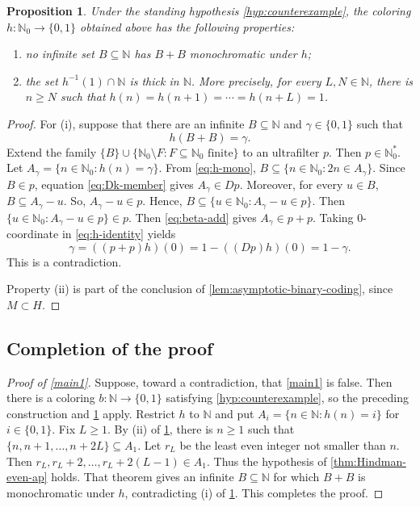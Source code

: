 \documentclass[reqno,12pt]{amsart}
\newtheorem{prop}[thm]{Proposition}
\newcommand{\Nzero}{\mathbb N_0}
\newcommand{\Nstar}{\Nzero^{*}}
\newcommand{\two}{\{0,1\}}
\def \N {\mathbb N}
\numberwithin{equation}{section}
\begin{document}
\begin{prop}\label{prop:counterexample-factor}
Under the standing hypothesis \eqref{hyp:counterexample}, the coloring
$h:\Nzero\to\two$ obtained above has the following properties:
\begin{enumerate}%
\item[(i)] no infinite set $B\subseteq\N$ has $B+B$ monochromatic under $h$;
\item[(ii)] the set $h^{-1}(1)\cap\N$ is thick in $\N$. More precisely,
      for every $L,N\in\N$, there is $n\geq N$ such that
      $h(n)=h(n+1)=\cdots=h(n+L)=1$.
\end{enumerate}
\end{prop}

\begin{proof}
	For (i), suppose that there are an infinite $B\subseteq\N$ and
	$\gamma\in\two$ such that
	\begin{equation}\label{eq:h-mono}
		h(B+B)=\gamma.
	\end{equation}
	Extend the family
	$
	\{B\}\cup
	\{\Nzero\setminus F:F\subseteq\Nzero\text{ finite}\}
	$
	to an ultrafilter $p$. Then $p\in \Nstar$.  Let
	$A_\gamma=\{n\in\Nzero:h(n)=\gamma\}$.  From \eqref{eq:h-mono},
	$
	B\subseteq\{n\in\Nzero:2n\in A_\gamma\}.
	$
	Since $B\in p$, equation \eqref{eq:Dk-member} gives
	$A_\gamma\in Dp$.  Moreover, for every $u\in B$,
	$B\subseteq A_\gamma-u$. So, $A_\gamma-u\in p$.  Hence,
	$
	B\subseteq\{u\in \Nzero:A_\gamma-u\in p\}.
	$
	Then $\{u\in \Nzero:A_\gamma-u\in p\}\in p$. Then \eqref{eq:beta-add} gives $A_\gamma\in p+p$.
	Taking $0$-coordinate in \eqref{eq:h-identity} yields
	\[
	\gamma=((p+p)h)(0)
	=1-((Dp)h)(0)
	=1-\gamma.
	\]
	This is a contradiction.
	
	Property (ii) is part of the conclusion of
	\cref{lem:asymptotic-binary-coding}, since $M\subset H$.
\end{proof}

\subsection{Completion of the proof}
\begin{proof}[Proof of \cref{main1}]
	Suppose, toward a contradiction, that \cref{main1} is false.  Then there
	is a coloring $b:\N\to\two$ satisfying \eqref{hyp:counterexample}, so the
	preceding construction and \cref{prop:counterexample-factor} apply.
	Restrict $h$ to $\N$ and put $A_i=\{n\in\N:h(n)=i\}$ for
	$i\in\two$.  Fix $L\geq1$.  By (ii) of \cref{prop:counterexample-factor}, there is $n\geq1$
	such that
	$
	\{n,n+1,\ldots,n+2L\}\subseteq A_1.
	$
	Let $r_L$ be the least even integer not smaller than $n$.  Then
	$
	r_L,r_L+2,\ldots,r_L+2(L-1)\in A_1.
	$
Thus the hypothesis of \cref{thm:Hindman-even-ap} holds.  That theorem gives an infinite $B\subseteq\N$ for which
$B+B$ is monochromatic under $h$, contradicting (i) of \cref{prop:counterexample-factor}.
This completes the proof.
\end{proof}
\end{document}
